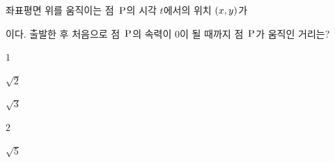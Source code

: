 \hspace*{2mm}\begin{minipage}[t]{\dimexpr\linewidth-2mm\relax}\vspace{0pt}
좌표평면 위를 움직이는 점~$\mathrm{P}$의 시각 $t$에서의 위치 $(x{,}\mkern3mu\mathopen{}y)$가 \par\smallskip{}\par\smallskip\noindent 이다. 출발한 후 처음으로 점~$\mathrm{P}$의 속력이 $0$이 될 때까지 점~$\mathrm{P}$가 움직인 거리는?
\begin{choices32}{\rule[-3ex]{0pt}{8ex}$1$}{\rule[-3ex]{0pt}{8ex}$\sqrt{2}$}{\rule[-3ex]{0pt}{8ex}$\sqrt{3}$}{\rule[-3ex]{0pt}{8ex}$2$}{\rule[-3ex]{0pt}{8ex}$\sqrt{5}$}\end{choices32}\end{minipage}
